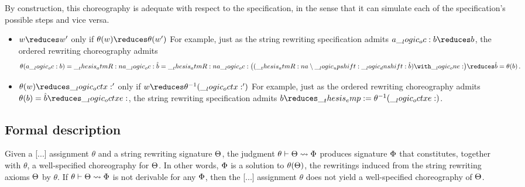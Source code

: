 By construction, this choreography is adequate with respect to the specification, in the sense that it can simulate each of the specification's possible steps and vice versa.
\begin{itemize}
\item $w \reduces w'$ only if $\theta(w) \reduces \theta(w')$
  For example, just as the string rewriting specification admits $a \oc b \reduces b$, the ordered rewriting choreography admits
  \begin{equation*}
    \theta(a \oc b) = \atmR{a} \oc \defp{b} = \atmR{a} \oc \bigl((\atmR{a} \limp \up \dn \defp{b}) \with \one\bigr) \reduces \defp{b} = \theta(b)
    \,.
  \end{equation*}

\item $\theta(w) \reduces \octx'$ only if $w \reduces \theta^{-1}(\octx')$
  For example, just as the ordered rewriting choreography admits $\theta(b) = \defp{b} \reduces \octxe$, the string rewriting specification admits $b \reduces \emp = \theta^{-1}(\octxe)$.
\end{itemize}

\subsection{Formal description}

Given a [...] assignment $\theta$ and a string rewriting signature $\Theta$, the judgment $\theta \vdash \Theta \rightsquigarrow \Phi$ produces  signature $\Phi$ that constitutes, together with $\theta$, a well-specified choreography for $\Theta$.
In other words, $\Phi$ is a solution to $\theta(\Theta)$, the rewritings induced from the string rewriting axioms $\Theta$ by $\theta$.
If $\theta \vdash \Theta \rightsquigarrow \Phi$ is not derivable for any $\Phi$, then the [...] assignment $\theta$ does not yield a well-specified choreography of $\Theta$.

